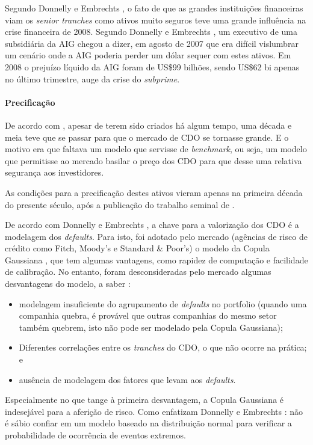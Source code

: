 \documentclass[
	12pt,				%
	oneside,			%
	a4paper,			%
	chapter=TITLE,		%
	section=TITLE,		%
	english,			%
	brazil				%
	]{abntex2}
\begin{document}
Segundo Donnelly e Embrechts \autocite[7]{devil}, o fato de que as
grandes instituições financeiras viam os \emph{senior tranches} como
ativos muito seguros teve uma grande influência na crise financeira de
2008. Segundo Donnelly e Embrechts \autocite[24]{devil}, um executivo de
uma subsidiária da AIG chegou a dizer, em agosto de 2007 que era difícil
vislumbrar um cenário onde a AIG poderia perder um dólar sequer com
estes ativos. Em 2008 o prejuízo líquido da AIG foram de US\$99 bilhões,
sendo US\$62 bi apenas no último trimestre, auge da crise do
\emph{subprime}.

\paragraph{Precificação}\label{precificauxe7uxe3o}

De acordo com \textcite{watts}, apesar de terem sido criados há algum
tempo, uma década e meia teve que se passar para que o mercado de
\gls{CDO} se tornasse grande. E o motivo era que faltava um modelo que
servisse de \emph{benchmark}, ou seja, um modelo que permitisse ao
mercado basilar o preço dos \gls{CDO} para que desse uma relativa
segurança aos investidores.

As condições para a precificação destes ativos vieram apenas na primeira
década do presente século, após a publicação do trabalho seminal de
\textcite{Li}.

De acordo com Donnelly e Embrechts \autocite*[7]{devil}, a chave para a
valorização dos \gls{CDO} é a modelagem dos \emph{defaults}. Para isto,
foi adotado pelo mercado (agências de risco de crédito como Fitch,
Moody's e Standard \& Poor's) o modelo da Copula Gaussiana
\autocite[14]{devil}, que tem algumas vantagens, como rapidez de
computação e facilidade de calibração. No entanto, foram desconsideradas
pelo mercado algumas desvantagens do modelo, a saber
\autocite[15]{devil}:
\begin{itemize}
\tightlist
\item
  modelagem insuficiente do agrupamento de \emph{defaults} no portfolio
  (quando uma companhia quebra, é provável que outras companhias do
  mesmo setor também quebrem, isto não pode ser modelado pela Copula
  Gaussiana);
\item
  Diferentes correlações entre os \emph{tranches} do CDO, o que não
  ocorre na prática; e
\item
  ausência de modelagem dos fatores que levam aos \emph{defaults}.
\end{itemize}
Especialmente no que tange à primeira desvantagem, a Copula Gaussiana é
indesejável para a aferição de risco. Como enfatizam Donnelly e
Embrechts \autocite*[16]{devil}: não é sábio confiar em um modelo
baseado na distribuição normal para verificar a probabilidade de
ocorrência de eventos extremos.
\end{document}
